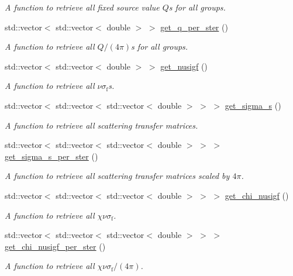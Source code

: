\begin{DoxyCompactItemize}
\begin{DoxyCompactList}\small\item\em A function to retrieve all fixed source value $Q$\textquotesingle{}s for all groups. \end{DoxyCompactList}\item 
std\+::vector$<$ std\+::vector$<$ double $>$ $>$ \hyperlink{class_material_properties_a3903e07c80bfe939a3a70be59c74bc53}{get\+\_\+q\+\_\+per\+\_\+ster} ()
\begin{DoxyCompactList}\small\item\em A function to retrieve all $Q/(4\pi)$\textquotesingle{}s for all groups. \end{DoxyCompactList}\item 
std\+::vector$<$ std\+::vector$<$ double $>$ $>$ \hyperlink{class_material_properties_a75afcc7707f4d77aedf439bacacbfb51}{get\+\_\+nusigf} ()
\begin{DoxyCompactList}\small\item\em A function to retrieve all $\nu\sigma_\mathrm{f}$\textquotesingle{}s. \end{DoxyCompactList}\item 
std\+::vector$<$ std\+::vector$<$ std\+::vector$<$ double $>$ $>$ $>$ \hyperlink{class_material_properties_a25c7a9ed0b651758dab132bf627c6269}{get\+\_\+sigma\+\_\+s} ()
\begin{DoxyCompactList}\small\item\em A function to retrieve all scattering transfer matrices. \end{DoxyCompactList}\item 
std\+::vector$<$ std\+::vector$<$ std\+::vector$<$ double $>$ $>$ $>$ \hyperlink{class_material_properties_a9dbfb1ca140d3b5de3dff2994899182f}{get\+\_\+sigma\+\_\+s\+\_\+per\+\_\+ster} ()
\begin{DoxyCompactList}\small\item\em A function to retrieve all scattering transfer matrices scaled by $4\pi$. \end{DoxyCompactList}\item 
std\+::vector$<$ std\+::vector$<$ std\+::vector$<$ double $>$ $>$ $>$ \hyperlink{class_material_properties_a85d99311c0e1ed1991e79cc6115f0403}{get\+\_\+chi\+\_\+nusigf} ()
\begin{DoxyCompactList}\small\item\em A function to retrieve all $\chi\nu\sigma_\mathrm{f}$. \end{DoxyCompactList}\item 
std\+::vector$<$ std\+::vector$<$ std\+::vector$<$ double $>$ $>$ $>$ \hyperlink{class_material_properties_a262e19465017da2dcd8acb02a2bcd5df}{get\+\_\+chi\+\_\+nusigf\+\_\+per\+\_\+ster} ()
\begin{DoxyCompactList}\small\item\em A function to retrieve all $\chi\nu\sigma_\mathrm{f}/(4\pi)$. \end{DoxyCompactList}\end{DoxyCompactItemize}
